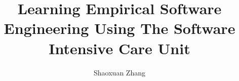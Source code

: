 \documentclass[11pt,final,thesis,actual]{uhthesis2e}
\begin{document}
\title{Learning Empirical Software Engineering Using The Software Intensive Care Unit}
\author{Shaoxuan Zhang}

\maketitle

\begin{frontmatter}

\signaturepage

\copyrightpage







\tableofcontents


\listoffigures

\end{frontmatter}
\end{document}
